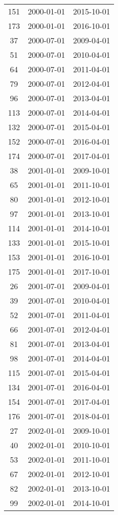 \begin{tabular}{ccc}
  151 & 2000-01-01 & 2015-10-01 \\ 
  173 & 2000-01-01 & 2016-10-01 \\ 
  37 & 2000-07-01 & 2009-04-01 \\ 
  51 & 2000-07-01 & 2010-04-01 \\ 
  64 & 2000-07-01 & 2011-04-01 \\ 
  79 & 2000-07-01 & 2012-04-01 \\ 
  96 & 2000-07-01 & 2013-04-01 \\ 
  113 & 2000-07-01 & 2014-04-01 \\ 
  132 & 2000-07-01 & 2015-04-01 \\ 
  152 & 2000-07-01 & 2016-04-01 \\ 
  174 & 2000-07-01 & 2017-04-01 \\ 
  38 & 2001-01-01 & 2009-10-01 \\ 
  65 & 2001-01-01 & 2011-10-01 \\ 
  80 & 2001-01-01 & 2012-10-01 \\ 
  97 & 2001-01-01 & 2013-10-01 \\ 
  114 & 2001-01-01 & 2014-10-01 \\ 
  133 & 2001-01-01 & 2015-10-01 \\ 
  153 & 2001-01-01 & 2016-10-01 \\ 
  175 & 2001-01-01 & 2017-10-01 \\ 
  26 & 2001-07-01 & 2009-04-01 \\ 
  39 & 2001-07-01 & 2010-04-01 \\ 
  52 & 2001-07-01 & 2011-04-01 \\ 
  66 & 2001-07-01 & 2012-04-01 \\ 
  81 & 2001-07-01 & 2013-04-01 \\ 
  98 & 2001-07-01 & 2014-04-01 \\ 
  115 & 2001-07-01 & 2015-04-01 \\ 
  134 & 2001-07-01 & 2016-04-01 \\ 
  154 & 2001-07-01 & 2017-04-01 \\ 
  176 & 2001-07-01 & 2018-04-01 \\ 
  27 & 2002-01-01 & 2009-10-01 \\ 
  40 & 2002-01-01 & 2010-10-01 \\ 
  53 & 2002-01-01 & 2011-10-01 \\ 
  67 & 2002-01-01 & 2012-10-01 \\ 
  82 & 2002-01-01 & 2013-10-01 \\ 
  99 & 2002-01-01 & 2014-10-01 \\ 

\end{tabular}
